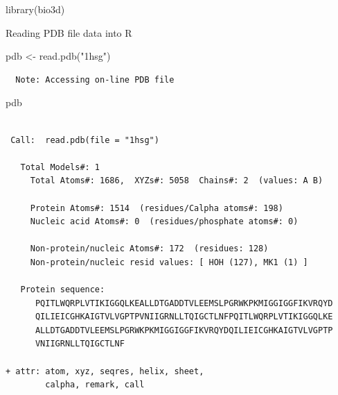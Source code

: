 \documentclass[
  letterpaper,
  DIV=11,
  numbers=noendperiod]{scrartcl}
\newenvironment{Shaded}{\begin{snugshade}}{\end{snugshade}}
\newcommand{\FunctionTok}[1]{\textcolor[rgb]{0.28,0.35,0.67}{#1}}
\newcommand{\NormalTok}[1]{\textcolor[rgb]{0.00,0.23,0.31}{#1}}
\newcommand{\OtherTok}[1]{\textcolor[rgb]{0.00,0.23,0.31}{#1}}
\newcommand{\StringTok}[1]{\textcolor[rgb]{0.13,0.47,0.30}{#1}}
\begin{document}
\begin{Shaded}
\begin{Highlighting}[]
\FunctionTok{library}\NormalTok{(bio3d)}
\end{Highlighting}
\end{Shaded}

Reading PDB file data into R

\begin{Shaded}
\begin{Highlighting}[]
\NormalTok{pdb }\OtherTok{\textless{}{-}} \FunctionTok{read.pdb}\NormalTok{(}\StringTok{"1hsg"}\NormalTok{)}
\end{Highlighting}
\end{Shaded}

\begin{verbatim}
  Note: Accessing on-line PDB file
\end{verbatim}

\begin{Shaded}
\begin{Highlighting}[]
\NormalTok{pdb}
\end{Highlighting}
\end{Shaded}

\begin{verbatim}

 Call:  read.pdb(file = "1hsg")

   Total Models#: 1
     Total Atoms#: 1686,  XYZs#: 5058  Chains#: 2  (values: A B)

     Protein Atoms#: 1514  (residues/Calpha atoms#: 198)
     Nucleic acid Atoms#: 0  (residues/phosphate atoms#: 0)

     Non-protein/nucleic Atoms#: 172  (residues: 128)
     Non-protein/nucleic resid values: [ HOH (127), MK1 (1) ]

   Protein sequence:
      PQITLWQRPLVTIKIGGQLKEALLDTGADDTVLEEMSLPGRWKPKMIGGIGGFIKVRQYD
      QILIEICGHKAIGTVLVGPTPVNIIGRNLLTQIGCTLNFPQITLWQRPLVTIKIGGQLKE
      ALLDTGADDTVLEEMSLPGRWKPKMIGGIGGFIKVRQYDQILIEICGHKAIGTVLVGPTP
      VNIIGRNLLTQIGCTLNF

+ attr: atom, xyz, seqres, helix, sheet,
        calpha, remark, call
\end{verbatim}
\end{document}
